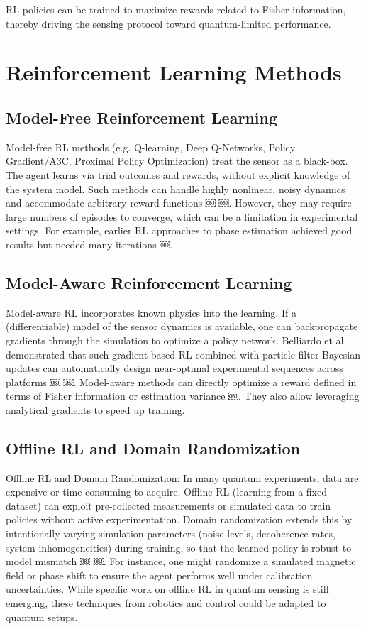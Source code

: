 \documentclass[
    aps,
    prx,
    reprint,
    superscriptaddress,
    amsmath,
    amssymb,
    longbibliography
]{revtex4-2}
\begin{document}
RL policies can be trained to maximize rewards related to Fisher
information, thereby driving the sensing protocol toward
quantum-limited performance.

\section{Reinforcement Learning Methods}





\subsection{Model-Free Reinforcement Learning}

Model-free RL methods (e.g. Q-learning, Deep Q-Networks, Policy
Gradient/A3C, Proximal Policy Optimization) treat the sensor as a
black-box. The agent learns via trial outcomes and rewards, without
explicit knowledge of the system model. Such methods can handle highly
nonlinear, noisy dynamics and accommodate arbitrary reward functions ￼
￼. However, they may require large numbers of episodes to converge,
which can be a limitation in experimental settings. For example,
earlier RL approaches to phase estimation achieved good results but
needed many iterations ￼.


\subsection{Model-Aware Reinforcement Learning}

Model-aware RL incorporates known physics into the learning. If a
(differentiable) model of the sensor dynamics is available, one can
backpropagate gradients through the simulation to optimize a policy
network. Belliardo et al. demonstrated that such gradient-based RL
combined with particle-filter Bayesian updates can automatically
design near-optimal experimental sequences across platforms ￼
￼. Model-aware methods can directly optimize a reward defined in terms
of Fisher information or estimation variance ￼. They also allow
leveraging analytical gradients to speed up training.


\subsection{Offline RL and Domain Randomization}

Offline RL and Domain Randomization: In many quantum experiments, data
are expensive or time-consuming to acquire. Offline RL (learning from
a fixed dataset) can exploit pre-collected measurements or simulated
data to train policies without active experimentation. Domain
randomization extends this by intentionally varying simulation
parameters (noise levels, decoherence rates, system inhomogeneities)
during training, so that the learned policy is robust to model
mismatch ￼ ￼. For instance, one might randomize a simulated magnetic
field or phase shift to ensure the agent performs well under
calibration uncertainties. While specific work on offline RL in
quantum sensing is still emerging, these techniques from robotics and
control could be adapted to quantum setups.
\end{document}
